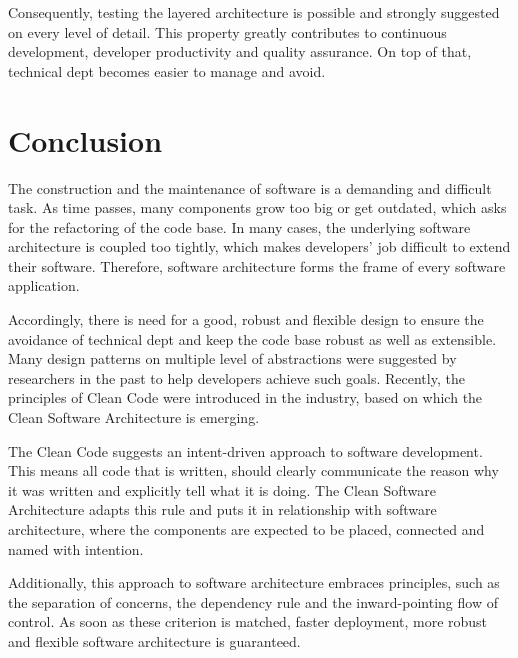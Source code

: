 \documentclass[conference]{IEEEtran}
\begin{document}
Consequently, testing the layered architecture is possible and strongly suggested on every level of detail. This property greatly contributes to continuous development, developer productivity and quality assurance. On top of that, technical dept becomes easier to manage and avoid. 


\section{Conclusion}
The construction and the maintenance of software is a demanding and difficult task. As time passes, many components grow too big or get outdated, which asks for the refactoring of the code base. In many cases, the underlying software architecture is coupled too tightly, which makes developers' job difficult to extend their software. Therefore, software architecture forms the frame of every software application.

Accordingly, there is need for a good, robust and flexible design to ensure the avoidance of technical dept and keep the code base robust as well as extensible. Many design patterns on multiple level of abstractions were suggested by researchers in the past to help developers achieve such goals. Recently, the principles of Clean Code were introduced in the industry, based on which the Clean Software Architecture is emerging. 

The Clean Code suggests an intent-driven approach to software development. This means all code that is written, should clearly communicate the reason why it was written and explicitly tell what it is doing. The Clean Software Architecture adapts this rule and puts it in relationship with software architecture, where the components are expected to be placed, connected and named with intention. 

Additionally, this approach to software architecture embraces principles, such as the separation of concerns, the dependency rule and the inward-pointing flow of control. As soon as these criterion is matched, faster deployment, more robust and flexible software architecture is guaranteed. 
\end{document}
